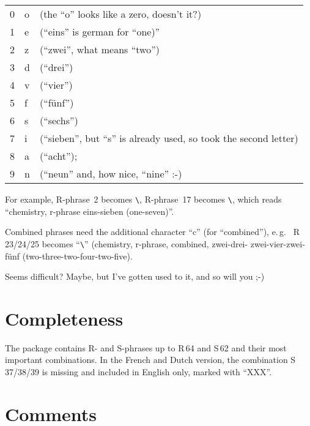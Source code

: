 \documentclass[pagesize=auto, fontsize=12pt, headings=normal]{scrartcl}
\makeatletter
\newcommand*{\cs}[1]{\texttt{\textbackslash#1}}
\newcommand*{\cmd}[1]{\cs{\expandafter\@gobble\string#1}}
\makeatother
\begin{document}
\medskip
\begin{tabular}{@{}l@{$\;\to\;$}>{\ttfamily}ll@{}}
  0 & o & (the \enquote{o} looks like a zero, doesn't it?)                               \\
  1 & e & (\enquote{eins} is german for \enquote{one)}                                   \\
  2 & z & (\enquote{zwei}, what means \enquote{two})                                     \\
  3 & d & (\enquote{drei})                                                               \\
  4 & v & (\enquote{vier})                                                               \\
  5 & f & (\enquote{fünf})                                                               \\
  6 & s & (\enquote{sechs})                                                              \\
  7 & i & (\enquote{sieben}, but \enquote{s} is already used, so took the second letter) \\
  8 & a & (\enquote{acht});                                                              \\
  9 & n & (\enquote{neun} and, how nice, \enquote{nine} :-)
\end{tabular}

\medskip
\noindent
For example, R-phrase~2 becomes \cmd{\crz}, R-phrase~17 becomes \cmd{\crei}, which reads
\enquote{chemistry, r-phrase eins-sieben (one-seven)}.

Combined phrases need the additional character \enquote{c} (for \enquote{combined}), e.\,g.\ %
R\,23/24/25 becomes \enquote{\cmd{\crczdzvzf}} (chemistry, r-phrase, combined, zwei-drei-
zwei-vier-zwei-fünf (two-three-two-four-two-five).

Seems difficult? Maybe, but I've gotten used to it, and so will you ;-)


\section{Completeness}

The package contains R- and S-phrases up to R\,64 and S\,62 and their most
important combinations.
In the French and Dutch version, the combination S\,37/38/39 is missing and
included in English only, marked with \enquote{XXX}.


\section{Comments}
\end{document}
